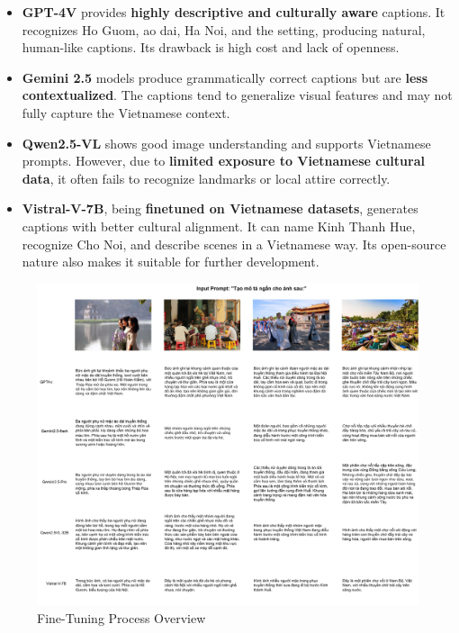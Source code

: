\documentclass[conference]{IEEEtran}
\begin{document}
\begin{itemize}
	\item \textbf{GPT-4V} provides \textbf{highly descriptive and culturally aware} captions. It recognizes Ho Guom, ao dai, Ha Noi, and the setting, producing natural, human-like captions. Its drawback is high cost and lack of openness.
	
	\item \textbf{Gemini 2.5} models produce grammatically correct captions but are \textbf{less contextualized}. The captions tend to generalize visual features and may not fully capture the Vietnamese context.
	
	\item \textbf{Qwen2.5-VL} shows good image understanding and supports Vietnamese prompts. However, due to \textbf{limited exposure to Vietnamese cultural data}, it often fails to recognize landmarks or local attire correctly.
	
	\item \textbf{Vistral-V-7B}, being \textbf{finetuned on Vietnamese datasets}, generates captions with better cultural alignment. It can name Kinh Thanh Hue, recognize Cho Noi, and describe scenes in a Vietnamese way. Its open-source nature also makes it suitable for further development.
\end{itemize}

\begin{figure}[h!]
	\centering
	\includegraphics[width=1\textwidth]{captioningreview.pdf} %
	\caption{Fine-Tuning Process Overview}
	\label{fig:reviewvllmcaptioning}
\end{figure}
\end{document}

